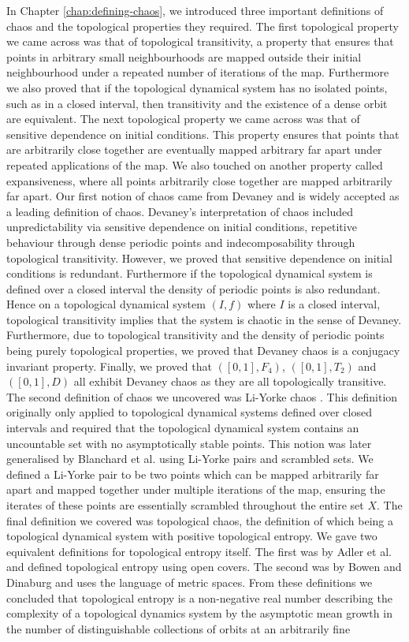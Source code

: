 In Chapter \ref{chap:defining-chaos}, we introduced three important definitions of chaos and the topological properties they required. The first topological property we came across was that of topological transitivity, a property that ensures that points in arbitrary small neighbourhoods are mapped outside their initial neighbourhood under a repeated number of iterations of the map. Furthermore we also proved that if the topological dynamical system has no isolated points, such as in a closed interval, then transitivity and the existence of a dense orbit are equivalent. The next topological property we came across was that of sensitive dependence on initial conditions. This property ensures that points that are arbitrarily close together are eventually mapped arbitrary far apart under repeated applications of the map. We also touched on another property called expansiveness, where all points arbitrarily close together are mapped arbitrarily far apart. Our first notion of chaos came from Devaney \cite{devaney} and is widely accepted as a leading definition of chaos. Devaney's interpretation of chaos included unpredictability via sensitive dependence on initial conditions, repetitive behaviour through dense periodic points and indecomposability through topological transitivity. However, we proved that sensitive dependence on initial conditions is redundant. Furthermore if the topological dynamical system is defined over a closed interval the density of periodic points is also redundant. Hence on a topological dynamical system $(I, f)$ where $I$ is a closed interval, topological transitivity implies that the system is chaotic in the sense of Devaney. Furthermore, due to topological transitivity and the density of periodic points being purely topological properties, we proved that Devaney chaos is a conjugacy invariant property. Finally, we proved that $([0, 1], F_4)$, $([0, 1], T_2)$ and $([0, 1], D)$ all exhibit Devaney chaos as they are all topologically transitive. The second definition of chaos we uncovered was Li-Yorke chaos \cite{li-yorke}. This definition originally only applied to topological dynamical systems defined over closed intervals and required that the topological dynamical system contains an uncountable set with no asymptotically stable points. This notion was later generalised by Blanchard et al.\cite{blanchard} using Li-Yorke pairs and scrambled sets. We defined a Li-Yorke pair to be two points which can be mapped arbitrarily far apart and mapped together under multiple iterations of the map, ensuring the iterates of these points are essentially scrambled throughout the entire set $X$. The final definition we covered was topological chaos, the definition of which being a topological dynamical system with positive topological entropy. We gave two equivalent definitions for topological entropy itself. The first was by Adler et al.\cite{adler} and defined topological entropy using open covers. The second was by Bowen and Dinaburg \cite{bowen} \cite{dinaburg} and uses the language of metric spaces. From these definitions we concluded that topological entropy is a non-negative real number describing the complexity of a topological dynamics system by the asymptotic mean growth in the number of distinguishable collections of orbits at an arbitrarily fine 